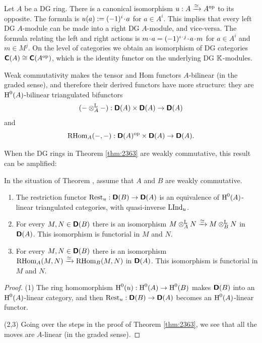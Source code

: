 Let $A$ be a DG ring. There is a canonical isomorphism 
 $u : A \xrightarrow{\simeq} A^{\mathrm{op}}$ to its opposite. The formula is 
$u(a) := (-1)^i \mspace{1.5mu}{\cdot}\mspace{1.5mu} a$
for $a \in A^i$. This implies that every left DG $A$-module can be made into a 
right DG $A$-module, and vice-versa. The formula relating the left and right 
actions is 
$m \mspace{1.5mu}{\cdot}\mspace{1.5mu} a = (-1)^{i \mspace{1.5mu}{\cdot}\mspace{1.5mu} j} \mspace{1.5mu}{\cdot}\mspace{1.5mu} a \mspace{1.5mu}{\cdot}\mspace{1.5mu} m$
for $a \in A^i$ and $m \in M^j$. 
On the level of categories we obtain an isomorphism of DG categories 
$\boldsymbol{\mathsf{C}}(A) \cong \boldsymbol{\mathsf{C}}(A^{\mathrm{op}})$,
which is the identity functor on the underlying DG $\mathbb{K}$-modules. 

Weak commutativity makes the tensor and Hom functors $A$-bilinear 
(in the graded sense), and therefore their derived functors have more 
structure: they are $\operatorname{H}^0(A)$-bilinear triangulated bifunctors 
\begin{equation} \label{eqn:2471}
(- \otimes^{\mathrm{L}}_A -) : \boldsymbol{\mathsf{D}}(A) \times \boldsymbol{\mathsf{D}}(A) \to \boldsymbol{\mathsf{D}}(A) 
\end{equation}
and 
\begin{equation} \label{eqn:2472}
\operatorname{RHom}_{A}(-, -) : \boldsymbol{\mathsf{D}}(A)^{\mathrm{op}} \times \boldsymbol{\mathsf{D}}(A) \to 
\boldsymbol{\mathsf{D}}(A) . 
\end{equation}

When the DG rings in Theorem \ref{thm:2363} are weakly commutative, 
this result can be amplified: 

\begin{prop} \label{prop:3150} 
In the situation of Theorem \tup{\ref{thm:2363}}, assume that $A$ and $B$ 
are weakly commutative. 
\begin{enumerate}
\item The restriction functor 
$\operatorname{Rest}_u : \boldsymbol{\mathsf{D}}(B) \to \boldsymbol{\mathsf{D}}(A)$
is an equivalence of $\operatorname{H}^0(A)$-linear triangulated categories, with 
quasi-inverse $\operatorname{LInd}_u$. 

\item For every $M, N \in \boldsymbol{\mathsf{D}}(B)$ there is an isomorphism
$M \otimes^{\mathrm{L}}_A N \xrightarrow{\simeq} M \otimes^{\mathrm{L}}_B N$
in $\boldsymbol{\mathsf{D}}(A)$. This isomorphism is functorial in $M$ and $N$.

\item For every $M, N \in \boldsymbol{\mathsf{D}}(B)$ there is an isomorphism 
$\opn{RHom}_{A}(M, N) \iso \lb \opn{RHom}_{B}(M, N)$
in $\boldsymbol{\mathsf{D}}(A)$. This isomorphism is functorial in $M$ and $N$.
\end{enumerate}
\end{prop}

\begin{proof} \mbox{}

\smallskip \noindent 
(1) The ring homomorphism 
$\operatorname{H}^0(u) : \operatorname{H}^0(A) \to \operatorname{H}^0(B)$
makes $\boldsymbol{\mathsf{D}}(B)$ into an $\operatorname{H}^0(A)$-linear category, and then 
$\operatorname{Rest}_u : \boldsymbol{\mathsf{D}}(B) \to \boldsymbol{\mathsf{D}}(A)$
becomes an $\operatorname{H}^0(A)$-linear functor. 

\medskip \noindent 
(2,3) Going over the steps in the proof of Theorem \ref{thm:2363}, we see that 
all the moves are $A$-linear (in the graded sense). 
\end{proof}

